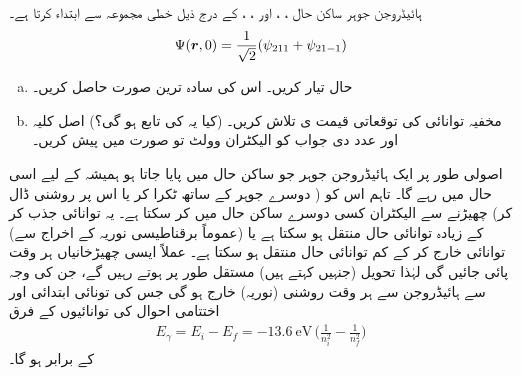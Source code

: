 ہائیڈروجن جوہر ساکن حال ، ،  اور ، ،  کے درج ذیل خطی مجموعہ سے ابتداء کرتا ہے۔
\begin{align*}
\Psi({{\boldsymbol{r}}},0)=\frac{1}{\sqrt{2}}(\psi_{211}+\psi_{21-1})
\end{align*}
\begin{enumerate}[a.]
\item
حال  تیار کریں۔ اس کی سادہ ترین صورت حاصل کریں۔
\item
مخفیہ توانائی کی توقعاتی قیمت ی  تلاش کریں۔ (کیا یہ  کی تابع ہو گی؟) اصل کلیہ اور عدد دی جواب کو الیکٹران وولٹ تو صورت میں پیش کریں۔
\end{enumerate}

اصولی طور پر ایک ہائیڈروجن جوہر جو ساکن حال  میں پایا جاتا ہو ہمیشہ کے لیے اسی حال میں رہے گا۔ تاہم اس کو ( دوسرے جوہر کے ساتھ ٹکرا کر یا اس پر روشنی ڈال کر) چھیڑنے سے الیکٹران کسی دوسرے ساکن حال میں  کر سکتا ہے۔ یہ توانائی جذب کر کے زیادہ توانائی حال منتقل ہو سکتا ہے یا (عموماً برقناطیسی نوریہ کے اخراج سے) توانائی خارج کر کے کم توانائی حال منتقل ہو سکتا ہے۔ عملاً ایسی چھیڑخانیاں ہر وقت پائی جائیں گی لہٰذا تحویل (جنہیں  کہتے ہیں) مستقل طور پر ہوتے رہیں گے، جن کی وجہ سے ہائیڈروجن سے ہر وقت روشنی (نوریہ) خارج ہو گی جس کی تونائی ابتدائی اور اختتامی احوال کی توانائیوں کے فرق
\begin{align}
E_{\gamma}=E_{i}-E_{f}=\SI{-13.6}{\electronvolt}\,\big(\frac{1}{n^{2}_{i}}-\frac{1}{n^{2}_{f}}\big)
\end{align}
 کے برابر ہو گا۔
 
